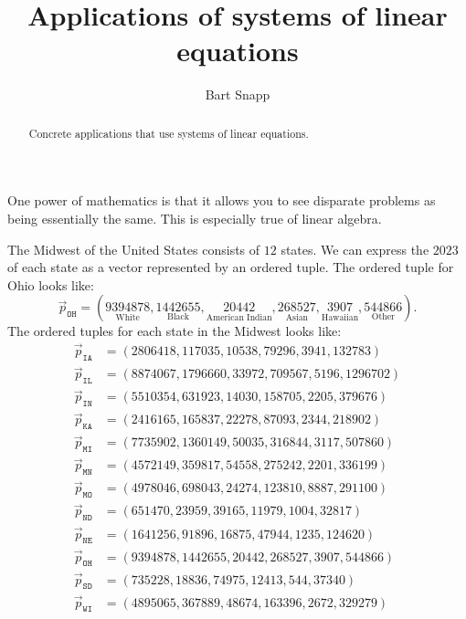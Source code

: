 \documentclass{ximera}
\author{Bart Snapp}
\title{Applications of systems of linear equations}
\begin{document}
\begin{abstract}
  Concrete applications that use systems of linear equations. 
\end{abstract}
\maketitle

One power of mathematics is that it allows you to see disparate problems as being essentially the same. This is especially true of linear algebra. 

\begin{example} %
  The Midwest of the United States consists of $12$ states. We can
  express the $2023$
  of each state as a vector represented by an ordered tuple. The
  ordered tuple for Ohio looks like:
  \[
  \vec{p}_{\texttt{OH}} = (\underset{\text{White}}{9394878},\underset{\text{Black}}{1442655},\underset{\text{American Indian}}{20442},\underset{\text{Asian}}{268527},\underset{\text{Hawaiian}}{3907},\underset{\text{Other}}{544866}).
  \]
  The ordered tuples for each state in the Midwest looks like:
\begin{align*}
  \vec{p}_{\texttt{IA}} &= (2806418,117035,10538,79296,3941,132783)\\
  \vec{p}_{\texttt{IL}} &= (8874067,1796660,33972,709567,5196,1296702)\\
  \vec{p}_{\texttt{IN}} &= (5510354,631923,14030,158705,2205,379676)\\
  \vec{p}_{\texttt{KA}} &= (2416165,165837,22278,87093,2344,218902)\\
  \vec{p}_{\texttt{MI}} &= (7735902,1360149,50035,316844,3117,507860)\\
  \vec{p}_{\texttt{MN}} &= (4572149,359817,54558,275242,2201,336199)\\
  \vec{p}_{\texttt{MO}} &= (4978046,698043,24274,123810,8887,291100)\\
  \vec{p}_{\texttt{ND}} &= (651470,23959,39165,11979,1004,32817)\\
  \vec{p}_{\texttt{NE}} &= (1641256,91896,16875,47944,1235,124620)\\
  \vec{p}_{\texttt{OH}} &= (9394878,1442655,20442,268527,3907,544866)\\
  \vec{p}_{\texttt{SD}} &= (735228,18836,74975,12413,544,37340)\\
  \vec{p}_{\texttt{WI}} &= (4895065,367889,48674,163396,2672,329279)
\end{align*}
\end{example}
\end{document}
